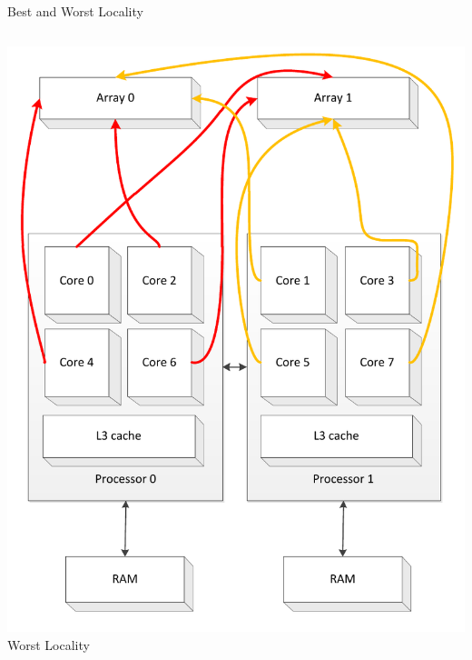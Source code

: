 \begin{frame}{Best and Worst Locality}
\begin{columns}[c]
\begin{column}{0.50\textwidth}
\begin{center}
        \includegraphics[width=\textwidth]{figures/cache-stress-test-mafushi-worst} \\
        \tiny{Worst Locality}
      \end{center}
    \end{column}
  \end{columns}
\end{frame}

